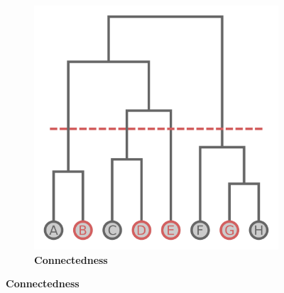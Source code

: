 \begin{figure}
\begin{adjustbox}{minipage=\dimexpr{}\fboxrule,fbox}
\begin{subfigure}[b]{0.45\textwidth}
            \includegraphics[width=\textwidth]{Extra_Graphics/Connectedness.pdf}
            \caption[Connectedness]{\textbf{Connectedness}}
            \label{fig:1.0.3b}
        \end{subfigure}
    \end{adjustbox}
\end{figure}

\blindtext

